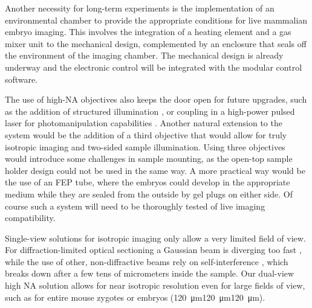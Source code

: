   Another necessity for long-term experiments is the implementation of an environmental chamber to provide the appropriate conditions for live mammalian embryo imaging. This involves the integration of a heating element and a gas mixer unit to the mechanical design, complemented by an enclosure that seals off the environment of the imaging chamber. The mechanical design is already underway and the electronic control will be integrated with the modular control software.

  The use of high-NA objectives also keeps the door open for future upgrades, such as the addition of structured illumination \cite{keller_fast_2010, chang_csilsfm_2017}, or coupling in a high-power pulsed laser for photomanipulation capabilities \cite{rauzi_probing_2017}. Another natural extension to the system would be the addition of a third objective that would allow for truly isotropic imaging and two-sided sample illumination. Using three objectives would introduce some challenges in sample mounting, as the open-top sample holder design could not be used in the same way. A more practical way would be the use of an FEP tube, where the embryos could develop in the appropriate medium while they are sealed from the outside by gel plugs on either side. Of course such a system will need to be thoroughly tested of live imaging compatibility.


  Single-view solutions for isotropic imaging only allow a very limited field of view. For diffraction-limited optical sectioning a Gaussian beam is diverging too fast \cite{dean_diagonally_2016}, while the use of other, non-diffractive beams rely on self-interference \cite{chen_lattice_2014}, which breaks down after a few tens of micrometers inside the sample. Our dual-view high NA solution allows for near isotropic resolution even for large fields of view, such as for entire mouse zygotes or embryos (\SI{120}{\micro m}\texttimes\SI{120}{\micro m}\texttimes\SI{120}{\micro m}).
  